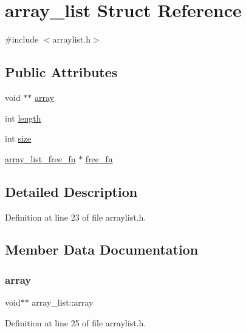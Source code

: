 \hypertarget{structarray__list}{}\section{array\+\_\+list Struct Reference}
\label{structarray__list}


{\ttfamily \#include $<$arraylist.\+h$>$}

\subsection*{Public Attributes}
\begin{DoxyCompactItemize}
\item 
void $\ast$$\ast$ \hyperlink{structarray__list_a7ba65feda2b156148c08667cf155b657}{array}
\item 
int \hyperlink{structarray__list_a442fcfde196a3cc95a647f0708de814d}{length}
\item 
int \hyperlink{structarray__list_aba48a197d3c8f1d56682da23fe883d0a}{size}
\item 
\hyperlink{arraylist_8h_a90d2ce204a483fa38f5514bad67222aa}{array\+\_\+list\+\_\+free\+\_\+fn} $\ast$ \hyperlink{structarray__list_ab7989cdde357e5c7819c562c7680ab74}{free\+\_\+fn}
\end{DoxyCompactItemize}


\subsection{Detailed Description}


Definition at line 23 of file arraylist.\+h.



\subsection{Member Data Documentation}
\mbox{\label{structarray__list_a7ba65feda2b156148c08667cf155b657}} 
\subsubsection{\texorpdfstring{array}{array}}
{\footnotesize\ttfamily void$\ast$$\ast$ array\+\_\+list\+::array}



Definition at line 25 of file arraylist.\+h.

